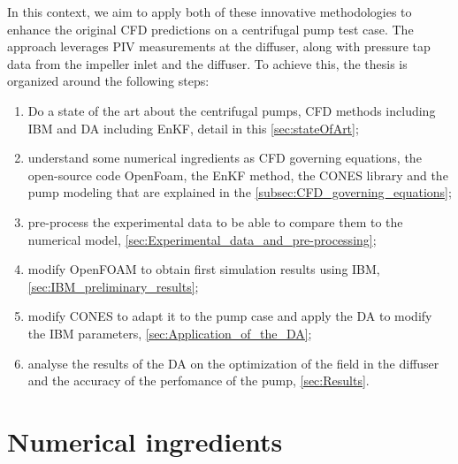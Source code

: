 \newpage

In this context, we aim to apply both of these innovative methodologies to enhance the original CFD predictions on a centrifugal pump test case. The approach leverages PIV measurements at the diffuser, along with pressure tap data from the impeller inlet and the diffuser. To achieve this, the thesis is organized around the following steps:

\begin{enumerate}
    \item Do a state of the art about the centrifugal pumps, CFD methods including IBM and DA including EnKF, detail in this \autoref{sec:stateOfArt};
    \item understand some numerical ingredients as CFD governing equations, the open-source code OpenFoam, the EnKF method, the CONES library and the pump modeling that are explained in the \autoref{subsec:CFD_governing_equations};
    \item pre-process the experimental data to be able to compare them to the numerical model, \autoref{sec:Experimental_data_and_pre-processing};
    \item modify OpenFOAM to obtain first simulation results using IBM, \autoref{sec:IBM_preliminary_results};
    \item modify CONES to adapt it to the pump case and apply the DA to modify the IBM parameters, \autoref{sec:Application_of_the_DA};
    \item analyse the results of the DA on the optimization of the field in the diffuser and the accuracy of the perfomance of the pump, \autoref{sec:Results}.
\end{enumerate}











\hspace{1cm}

\newpage

\section{Numerical ingredients}

